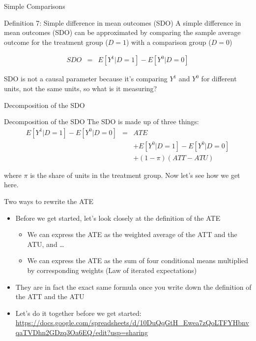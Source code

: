 \documentclass{beamer}
\begin{document}


\begin{frame}{Simple Comparisons}



  \begin{block}{Definition 7: Simple difference in mean outcomes (SDO)}
    A simple difference in mean outcomes (SDO) can be approximated by comparing the sample average outcome for the treatment group ($D=1$) with a comparison group ($D=0$)
    
    \begin{eqnarray*}
      SDO &=& E[Y^1 | D=1] - E[Y^0 | D=0]
    \end{eqnarray*}
  \end{block}
  \bigskip

SDO is not a causal parameter because it's comparing $Y^1$ and $Y^0$ for different units, not the same units, so what is it measuring? 

\end{frame}


\begin{frame}{Decomposition of the SDO}

  \begin{block}{Decomposition of the SDO}
    The SDO is made up of three things:
    \begin{eqnarray*}
      E[Y^1 | D=1] - E[Y^0 | D=0]&=& ATE\nonumber \\
      &&+ E[Y^0|D=1] - E[Y^0|D=0] \nonumber \\
      && + (1-\pi)(ATT - ATU)
    \end{eqnarray*}
  \end{block}

\bigskip

where $\pi$ is the share of units in the treatment group.  Now let's see how we get here.
\end{frame}

\begin{frame}{Two ways to rewrite the ATE}

\begin{itemize}
\item Before we get started, let's look closely at the definition of the ATE
	\begin{itemize}
	\item We can express the ATE as the weighted average of the ATT and the ATU, and \dots
	\item We can express the ATE as the sum of four conditional means multiplied by corresponding weights (Law of iterated expectations)
	\end{itemize}
\item They are in fact the exact same formula once you write down the definition of the ATT and the ATU
\item Let's do it together before we get started: \url{https://docs.google.com/spreadsheets/d/10DuQqGtH_Ewea7zQoLTFYHbnvqaTVDhn2GDzq3Oa6EQ/edit?usp=sharing}

\end{itemize}

\end{frame}
\end{document}
